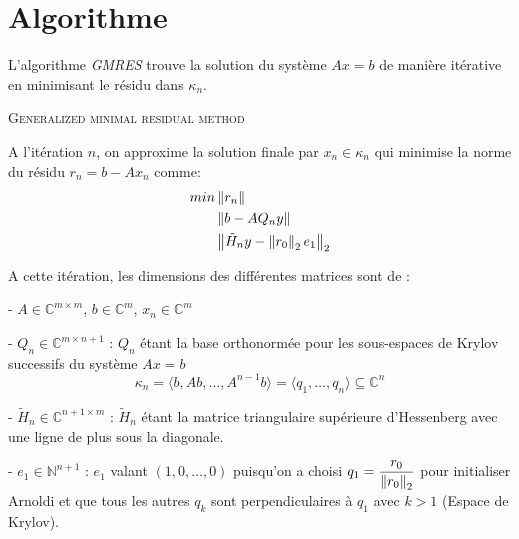 \documentclass{article}[11pt]
\begin{document}
\mytitle
\section{Algorithme}
\label{sec:algorithme}

L'algorithme \textit{GMRES} trouve la solution du système $Ax=b$ de manière itérative en minimisant le résidu dans $\kappa_n$.

\vspace{.5cm}

\begin{algorithm}[H]
\DontPrintSemicolon
{}
\caption{\textsc{Generalized minimal residual method}}
\label{algo:gmres}
\end{algorithm}

\vspace{.5cm}

A l'itération $n$, on approxime la solution finale par $x_n \in \kappa_n$ qui minimise la norme du résidu $r_n = b - Ax_n$ comme:
\begin{align}
        min &\left\lVert r_n\right\rVert \\
        &\left\lVert b-AQ_ny\right\rVert \\
		&\left\lVert\tilde{H}_n y - \left\lVert r_0\right\rVert_2 e_1\right\rVert_2
\end{align}

A cette itération, les dimensions des différentes matrices sont de :

- $A \in \mathbb{C}^{m\times m}$, $b \in \mathbb{C}^{m}$, $x_n \in \mathbb{C}^{m}$

- $Q_n \in \mathbb{C}^{m\times n+1}$ : $Q_n$ étant la base orthonormée pour les sous-espaces de Krylov successifs du système $Ax=b$
\[
    \kappa_n = \langle b, Ab, \dots, A^{n-1}b\rangle = \langle q_1, \dots, q_n\rangle \subseteq \mathbb{C}^n
\]

- $\tilde{H}_n \in \mathbb{C}^{n+1\times m}$ : $\tilde{H}_n$ étant la matrice triangulaire supérieure d'Hessenberg avec une ligne de plus sous la diagonale.

- $e_1 \in \mathbb{N}^{n+1}$ : $e_1$ valant $(1, 0, \dots, 0)$ puisqu'on a choisi $q_1 = \dfrac{r_0}{\left\lVert r_0\right\rVert_2}$ pour initialiser Arnoldi et que tous les autres $q_k$ sont perpendiculaires à $q_1$ avec $k>1$ (Espace de Krylov).
\end{document}
